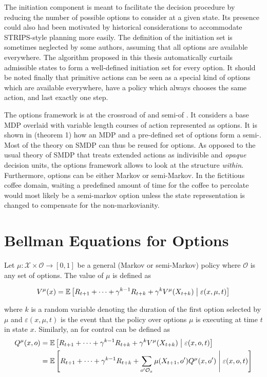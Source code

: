 The initiation component is meant to facilitate the decision procedure by reducing the number of possible options to consider at a given state. Its presence could also had been motivated by  historical considerations to accommodate STRIPS-style planning \parencite{Fikes1972} more easily. The definition of the initiation set is sometimes neglected  by some authors, assuming that all options are available everywhere. The algorithm proposed in this thesis automatically curtails admissible states to form a well-defined initiation set for every option. It should be noted finally that primitive actions can be seen as a special kind of options which are available everywhere, have a policy which always chooses the same action, and last exactly one step. 

The options framework is at the crossroad of  \mdps and semi-\mdps of
\cite{Bradtke1994}. It considers a base MDP overlaid with variable length courses of
action represented as options. It is shown in \cite{Sutton1999} (theorem 1) how an
MDP and a pre-defined set of options form a semi-\mdp. Most of the theory on SMDP can
thus be reused for options. As opposed to the usual theory of SMDP that treats
extended actions as indivisible and \textit{opaque} decision units, the options
framework allows to look at the structure \textit{within}. Furthermore, options can be either Markov or semi-Markov. In the fictitious coffee domain, waiting a predefined amount of time for the coffee to percolate would most likely be a semi-markov option unless the
state representation is changed to compensate for the non-markovianity.


\section{Bellman Equations for Options}

Let $\mu : \mathcal{X} \times \mathcal{O} \to [0, 1]$  be a general (Markov or semi-Markov) policy where $\mathcal{O}$ is any set of options. The value of $\mu$ is defined as

\begin{equation}
V^\mu(x) = \operatorname{\mathbb{E}} \left[ R_{t+1} + \dots + \gamma^{k-1}R_{t+k} + \gamma^k
V^\mu(X_{t+k})  \;\middle\vert\; \varepsilon(x, \mu, t) \right]
\label{eq:value-option-policy}
\end{equation}

where $k$ is a random variable denoting the duration of the first option selected by
$\mu$ and $\varepsilon(x, \mu, t)$ is the event that the policy over options $\mu$ is
executing at time $t$ in state $x$. Similarly, an  for control can be defined as 
\begin{align}
Q^\mu(x, o) &= \operatorname{\mathbb{E}} \left[ R_{t+1} + \dots + \gamma^{k-1}R_{t+k} +
\gamma^k V^\mu(X_{t+k})  \;\middle\vert\; \varepsilon(x, o, t) \right] \notag \\
&= \operatorname{\mathbb{E}} \left[ R_{t+1} + \dots + \gamma^{k-1}R_{t+k} + \sum_{o^\prime
\mathcal{O}_x} \mu(X_{t+1}, o^\prime)Q^\mu(x, o^\prime) \;\middle\vert\; \varepsilon(x, o,
t) \right]
\label{eq:option-value-function}
\end{align}

